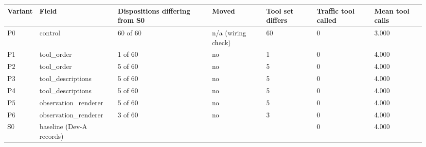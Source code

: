\begin{tabular}{lllllll}
\toprule
Variant & Field & Dispositions differing from S0 & Moved & Tool set differs & Traffic tool called & Mean tool calls \\
\midrule
P0 & control & 60 of 60 & n/a (wiring check) & 60 & 0 & 3.000 \\
P1 & tool\_order & 1 of 60 & no & 1 & 0 & 4.000 \\
P2 & tool\_order & 5 of 60 & no & 5 & 0 & 4.000 \\
P3 & tool\_descriptions & 5 of 60 & no & 5 & 0 & 4.000 \\
P4 & tool\_descriptions & 5 of 60 & no & 5 & 0 & 4.000 \\
P5 & observation\_renderer & 5 of 60 & no & 5 & 0 & 4.000 \\
P6 & observation\_renderer & 3 of 60 & no & 3 & 0 & 4.000 \\
S0 & baseline (Dev-A records) &  &  &  & 0 & 4.000 \\
\bottomrule
\end{tabular}
